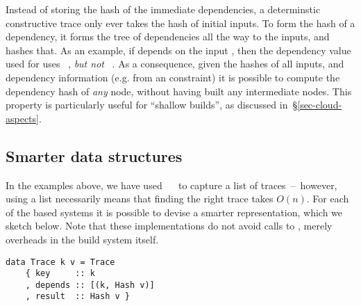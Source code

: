 Instead of storing the hash of the immediate dependencies, a determinstic constructive trace only ever takes the hash of initial inputs. To form the hash of a dependency, it forms the tree of dependencies all the way to the inputs, and hashes that. As an example, if  depends on the input , then the dependency value used for  uses ~, \emph{but not} ~. As a consequence, given the hashes of all inputs, and dependency information (e.g. from an  constraint) it is possible to compute the dependency hash of \emph{any} node, without having built any intermediate nodes. This property is particularly useful for ``shallow builds'', as discussed in~\S\ref{sec-cloud-aspects}.

\subsection{Smarter \hs{[Trace]} data structures}\label{sec-smart-traces}

In the examples above, we have used \hs{[Trace}~~\hs{v]} to capture a list
of traces~--~however, using a list necessarily means that finding the right trace
takes $O(n)$. For each of the  based systems it is possible to devise
a smarter representation, which we sketch below. Note that these implementations
do not avoid calls to , merely overheads in the build system itself.

\begin{verbatim}
data Trace k v = Trace
    { key     :: k
    , depends :: [(k, Hash v)]
    , result  :: Hash v }
\end{verbatim}


